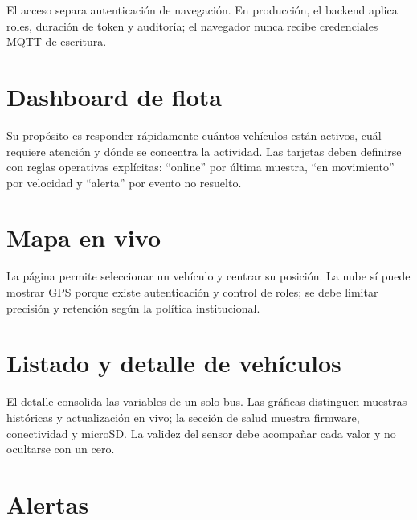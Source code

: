 \documentclass[11pt,a4paper,oneside]{report}
\begin{document}
El acceso separa autenticación de navegación. En producción, el backend aplica roles,
duración de token y auditoría; el navegador nunca recibe credenciales MQTT de escritura.

\section{Dashboard de flota}

Su propósito es responder rápidamente cuántos vehículos están activos, cuál requiere
atención y dónde se concentra la actividad. Las tarjetas deben definirse con reglas
operativas explícitas: ``online'' por última muestra, ``en movimiento'' por velocidad y
``alerta'' por evento no resuelto.

\section{Mapa en vivo}

La página permite seleccionar un vehículo y centrar su posición. La nube sí puede
mostrar GPS porque existe autenticación y control de roles; se debe limitar precisión y
retención según la política institucional.

\section{Listado y detalle de vehículos}


El detalle consolida las variables de un solo bus. Las gráficas distinguen muestras
históricas y actualización en vivo; la sección de salud muestra firmware, conectividad
y microSD. La validez del sensor debe acompañar cada valor y no ocultarse con un cero.

\section{Alertas}
\end{document}
